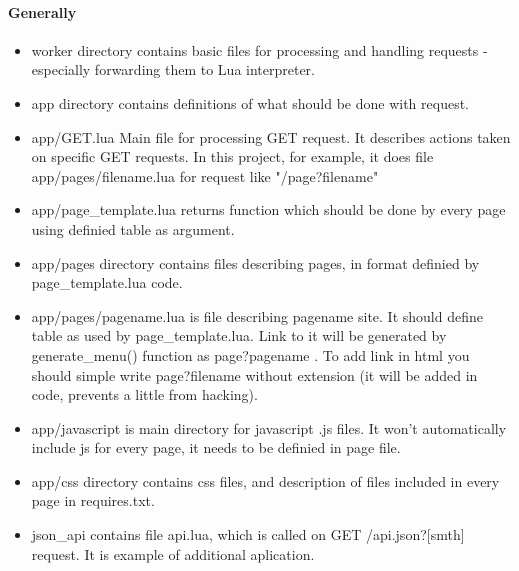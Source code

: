 \documentclass[a4paper]{article}
\begin{document}
\paragraph{Generally}
	\begin{itemize}
		\item{worker} directory contains basic files for processing and 
handling requests - especially forwarding them to Lua interpreter.
		\item{app} directory contains definitions of what should be done
with request.
		\item{app/GET.lua} Main file for processing GET request. It
describes actions taken on specific GET requests. In this project, for
example, it does file app/pages/filename.lua for request like
"/page?filename"
		\item{app/page\_template.lua} returns function which should be done
by every page using definied table as argument.
		\item{app/pages} directory contains files describing pages, in
format definied by page\_template.lua code.
		\item{app/pages/pagename.lua} is file describing pagename site.
It should define table as used by page\_template.lua. Link to it will be
generated by generate\_menu() function as page?pagename . 
To add link in html you should simple write page?filename without
extension (it will be added in code, prevents a little from hacking).
		\item{app/javascript} is main directory for javascript .js files.
It won't automatically include js for every page, it needs to be definied
in page file.
		\item{app/css} directory contains css files, and description of
files included in every page in requires.txt.
		\item{json\_api} contains file api.lua, which is called on GET
/api.json?[smth] request. It is example of additional aplication.
	\end{itemize}
\end{document}
